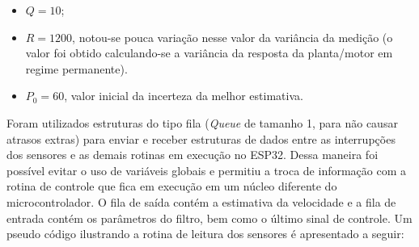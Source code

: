 \begin{itemize}
    \item $Q = 10$;
    \item $R = 1200$, notou-se pouca variação nesse valor da variância da medição (o valor foi obtido calculando-se a variância da resposta da planta/motor em regime permanente).
    \item $P_0 = 60$, valor inicial da incerteza da melhor estimativa.
\end{itemize}

Foram utilizados estruturas do tipo fila (\emph{Queue} de tamanho 1, para não causar atrasos extras) para enviar e receber estruturas de dados entre as interrupções dos sensores e as demais rotinas em execução no ESP32. Dessa maneira foi possível evitar o uso de variáveis globais e permitiu a troca de informação com a rotina de controle que fica em execução em um núcleo diferente do microcontrolador. O fila de saída contém a estimativa da velocidade e a fila de entrada contém os parâmetros do filtro, bem como o último sinal de controle. Um pseudo código ilustrando a rotina de leitura dos sensores é apresentado a seguir:

